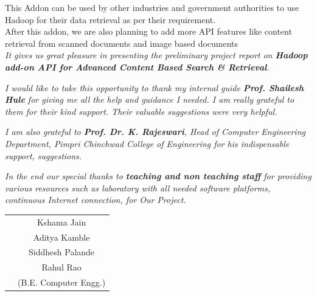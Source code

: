 \documentclass[oneside,a4paper,12pt]{report}
\begin{document}
This Addon can be used by other industries and government authorities to use Hadoop for their data retrieval as per their requirement. \\

After this addon, we are also planning to add more API features like content retrieval from scanned documents and image based documents \\


{   \setlength{\parindent}{11mm} }
{ \setlength{\parindent}{0mm} }
\textit{It gives us great pleasure in presenting the preliminary project report 
on {\bfseries \fontsize{12}{12} \selectfont Hadoop add-on API for Advanced Content Based Search \& Retrieval}.}
\vspace*{1.5\baselineskip}

 \textit{I would like to take this opportunity to thank my internal guide
 \textbf{Prof. Shailesh Hule} for giving me all the help and guidance I needed. I am
 really grateful to them for their kind support. Their valuable suggestions were very helpful.} \vspace*{1.5\baselineskip}

 \textit{I am also grateful to \textbf{Prof. Dr. K. Rajeswari}, Head of Computer
 Engineering Department, Pimpri Chinchwad College of Engineering for his indispensable
 support, suggestions.}
\vspace*{1.5\baselineskip}

\textit{In the end our special thanks to \textbf{teaching and non teaching staff} for
providing various resources such as  laboratory with all needed software platforms,
continuous Internet connection, for Our Project.}
\vspace*{3\baselineskip} \\
\begin{tabular}{p{8.2cm}c}
&Kshama Jain\\
&Aditya Kamble\\
&Siddhesh Palande\\
&Rahul Rao\\
&(B.E. Computer Engg.)
\end{tabular}


\tableofcontents
\listoffigures 
\listoftables
\end{document}
